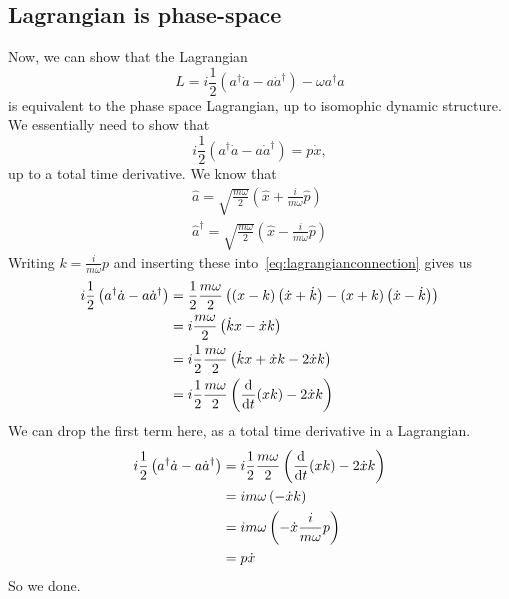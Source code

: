\documentclass{article}
\begin{document}
	\subsection{Lagrangian is phase-space} \label{subsec:lagrangianphasespace}
	Now, we can show that the Lagrangian
	\begin{equation}
		L = i\frac12 \left(a^\dagger \dot{a} - a \dot{a}^\dagger \right) - \omega a^\dagger a
	\end{equation}
	is equivalent to the phase space Lagrangian, up to isomophic dynamic structure.
	We essentially need to show that
	\begin{equation}
		i\frac12 \left(a^\dagger \dot{a} - a \dot{a}^\dagger \right) = p \dot{x}, \label{eq:lagrangianconnection}
	\end{equation}
	up to a total time derivative.
	We know that
	\begin{align}
		\hat{a} = \sqrt{\frac{m \omega}{2}} \left(\hat{x} + \frac{i}{m \omega} \hat{p} \right) \\
		\hat{a}^\dagger = \sqrt{\frac{m \omega}{2}} \left(\hat{x} - \frac{i}{m \omega} \hat{p} \right)
	\end{align}
	Writing $k = \frac{i}{m \omega} p$ and inserting these into~\eqref{eq:lagrangianconnection} gives us
	\begin{align}
		i\frac12 \left(a^\dagger \dot{a} - a \dot{a}^\dagger \right) &= \frac12 \frac{m \omega}{2} \left( \left( x - k \right)\left(\dot{x} + \dot{k} \right) - \left(x + k \right) \left(\dot{x} - \dot{k} \right)\right) \\
		&= i  \frac{m \omega}{2} \left( \dot{k} x - \dot{x} k \right) \\
		&= i \frac12 \frac{m \omega}{2} \left( \dot{k} x + \dot{x} k - 2 \dot{x} k \right) \\
		&= i \frac12 \frac{m \omega}{2} \left( \dv{t}(xk) - 2 \dot{x} k \right)
	\end{align}
	We can drop the first term here, as a total time derivative in a Lagrangian.
	\begin{align}
		i\frac12 \left(a^\dagger \dot{a} - a \dot{a}^\dagger \right) &= i \frac12 \frac{m \omega}{2} \left( \dv{t}(xk) - 2 \dot{x} k \right) \\
		&= i m \omega \left( - \dot{x} k \right) \\
		&= i m \omega \left( - \dot{x} \frac{i}{m \omega} p \right) \\
		&= p \dot{x}
	\end{align}
	So we done.

	\newpage
	\listoftodos
\end{document}
